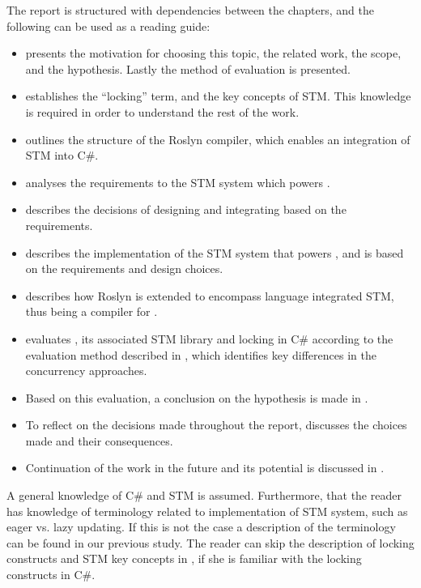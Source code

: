 The report is structured with dependencies between the chapters, and the following can be used as a reading guide:
\begin{itemize}
	\item {} presents the motivation for choosing this topic, the related work, the scope, and the hypothesis. Lastly the method of evaluation is presented.
	\item {} establishes the ``locking'' term, and the key concepts of \ac{STM}. This knowledge is required in order to understand the rest of the work.
	\item {} outlines the structure of the Roslyn compiler, which enables an integration of \ac{STM} into C\#.
	\item {} analyses the requirements to the \ac{STM} system which powers \stmname.
	\item {} describes the decisions of designing and integrating \stmname based on the requirements.
	\item {} describes the implementation of the \ac{STM} system that powers \stmname, and is based on the requirements and design choices.
	\item {} describes how Roslyn is extended to encompass language integrated \ac{STM}, thus being a compiler for \stmname.
	\item {} evaluates \stmname, its associated \ac{STM} library and locking in C\# according to the evaluation method described in , which identifies key differences in the concurrency approaches.
	\item Based on this evaluation, a conclusion on the hypothesis is made in .
	 \item To reflect on the decisions made throughout the report,  discusses the choices made and their consequences.
	 \item Continuation of the work in the future and its potential is discussed in .
\end{itemize}

A general knowledge of C\# and \ac{STM} is assumed. Furthermore, that the reader has knowledge of terminology related to implementation of \ac{STM} system, such as eager vs. lazy updating. If this is not the case a description of the terminology can be found in our previous study\cite[p. 53]{dpt907e14trending}. The reader can skip the description of locking constructs and \ac{STM} key concepts in , if she is familiar with the locking constructs in C\#.


